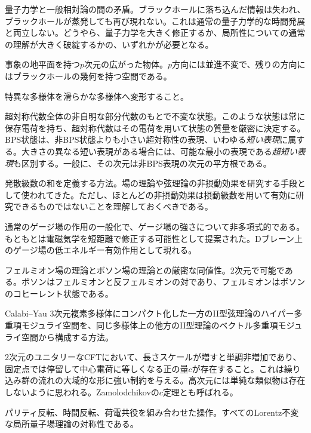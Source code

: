{量子力学と一般相対論の間の矛盾。ブラックホールに落ち込んだ情報は失われ、ブラックホールが蒸発しても再び現れない。これは通常の量子力学的な時間発展と両立しない。どうやら、量子力学を大きく修正するか、局所性についての通常の理解が大きく破綻するかの、いずれかが必要となる。}

{事象の地平面を持つ$p$次元の広がった物体。$p$方向には並進不変で、残りの方向にはブラックホールの幾何を持つ空間である。}

{特異な多様体を滑らかな多様体へ変形すること。}

{超対称代数全体の非自明な部分代数のもとで不変な状態。このような状態は常に保存電荷を持ち、超対称代数はその電荷を用いて状態の質量を厳密に決定する。BPS状態は、非BPS状態よりも小さい超対称性の表現、いわゆる\emph{短い表現}に属する。大きさの異なる短い表現がある場合には、可能な最小の表現である\emph{超短い表現}も区別する。一般に、その次元は非BPS表現の次元の平方根である。}

{発散級数の和を定義する方法。場の理論や弦理論の非摂動効果を研究する手段として使われてきた。ただし、ほとんどの非摂動効果は摂動級数を用いて有効に研究できるものではないことを理解しておくべきである。}

{通常のゲージ場の作用の一般化で、ゲージ場の強さについて非多項式的である。もともとは電磁気学を短距離で修正する可能性として提案された。Dブレーン上のゲージ場の低エネルギー有効作用として現れる。}

{フェルミオン場の理論とボソン場の理論との厳密な同値性。2次元で可能である。ボソンはフェルミオンと反フェルミオンの対であり、フェルミオンはボソンのコヒーレント状態である。}

{Calabi--Yau 3次元複素多様体にコンパクト化した一方のII型弦理論のハイパー多重項モジュライ空間を、同じ多様体上の他方のII型理論のベクトル多重項モジュライ空間から構成する方法。}

{2次元のユニタリーなCFTにおいて、長さスケールが増すと単調非増加であり、固定点では停留して中心電荷に等しくなる正の量$c$が存在すること。これは繰り込み群の流れの大域的な形に強い制約を与える。高次元には単純な類似物は存在しないように思われる。Zamolodchikovの$c$定理とも呼ばれる。}

{パリティ反転、時間反転、荷電共役を組み合わせた操作。すべてのLorentz不変な局所量子場理論の対称性である。}

